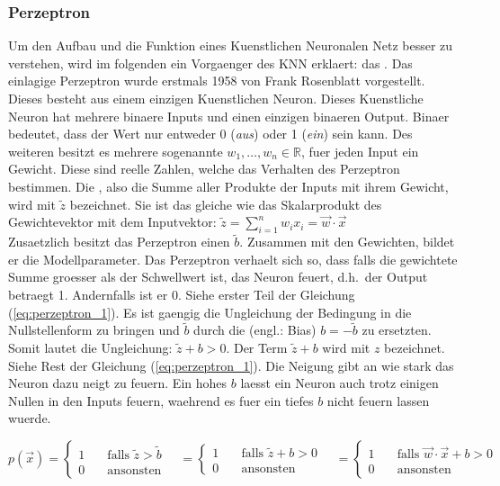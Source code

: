 \documentclass[../main]{subfiles}
\begin{document}
\subsubsection{Perzeptron}
Um den Aufbau und die Funktion eines Kuenstlichen Neuronalen Netz besser zu
verstehen, wird im folgenden ein Vorgaenger des KNN erklaert: das .
\para
Das einlagige Perzeptron wurde erstmals 1958 von Frank Rosenblatt vorgestellt. Dieses
besteht aus einem einzigen Kuenstlichen Neuron. Dieses Kuenstliche Neuron
hat mehrere binaere Inputs und einen einzigen binaeren Output. Binaer
bedeutet, dass der Wert nur entweder 0 (\textit{aus}) oder 1 (\textit{ein}) sein
kann. Des weiteren besitzt es mehrere sogenannte  $w_1, \ldots,
w_n \in \mathbb{R}$, fuer jeden Input ein Gewicht.
Diese sind reelle Zahlen, welche das Verhalten des Perzeptron bestimmen.
Die , also die Summe aller Produkte der Inputs mit
ihrem Gewicht, wird mit $\tilde{z}$ bezeichnet.
Sie ist das gleiche wie das Skalarprodukt des Gewichtevektor mit dem Inputvektor:
$\displaystyle \tilde{z} = \sum_{i=1}^{n} w_i x_i = \vec{w} \cdot \vec{x}$\\
Zusaetzlich besitzt das Perzeptron einen  $\tilde{b}$.
Zusammen mit den Gewichten, bildet er die Modellparameter.
Das Perzeptron verhaelt sich so, dass falls die gewichtete Summe groesser als der
Schwellwert ist, das Neuron feuert, d.h.\ der Output betraegt 1. Andernfalls ist er 0.
Siehe erster Teil der Gleichung (\ref{eq:perzeptron_1}).
Es ist gaengig die Ungleichung der Bedingung in die Nullstellenform zu bringen
und $\tilde{b}$ durch die  (engl.: Bias)
$b = -\tilde{b}$ zu ersetzten. Somit lautet die Ungleichung: $\tilde{z} + b
> 0$. Der Term $\tilde{z} + b$ wird mit $z$ bezeichnet. Siehe Rest der Gleichung (\ref{eq:perzeptron_1}).
Die Neigung gibt an wie stark das Neuron dazu neigt zu feuern. Ein hohes $b$
laesst ein Neuron auch trotz einigen Nullen in den Inputs feuern, waehrend es
fuer ein tiefes $b$ nicht feuern lassen wuerde.

\begin{equation}\label{eq:perzeptron_1}
  p(\vec{x}) =
  \begin{cases}
    1 & \quad \text{falls } \tilde{z} > \tilde{b}\\
    0 & \quad \text{ansonsten}
  \end{cases}
  \quad =
  \begin{cases}
    1 & \quad \text{falls } \tilde{z} + b > 0\\
    0 & \quad \text{ansonsten}
  \end{cases}
  \quad =
  \begin{cases}
    1 & \quad\text{falls } \vec{w} \cdot \vec{x} + b > 0\\
    0 & \quad\text{ansonsten}
  \end{cases}
\end{equation}
\end{document}
